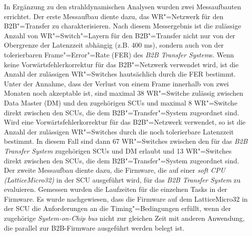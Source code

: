 In Ergänzung zu den strahldynamischen Analysen wurden zwei Messaufbauten errichtet. Der erste Messaufbau diente dazu, das WR"=Netzwerk f\"ur den B2B"=Transfer zu cha­rak­te­ri­sie­ren. Nach diesem Messergebnis ist die zul\"assige Anzahl von WR"=Switch"=Layern f\"ur den B2B"=Transfer nicht nur von der Obergrenze der Latenzzeit abh\"angig (z.B. 400 ms), sondern auch von der tolerierbaren Frame"=Error"=Rate (FER) des \textit{B2B Transfer System}s. Wenn keine Vorw\"artsfehlerkorrektur f\"ur das B2B"=Netzwerk verwendet wird, ist die Anzahl der zul\"assigen WR"=Switches hauts\"achlich durch die FER bestimmt. Unter der Annahme, dass der Verlust von einem Frame innerhalb von zwei Monaten noch akzeptable ist, sind maximal 38 WR"=Switche zul\"assig zwischen Data Master (DM) und den zugeh\"origen SCUs und maximal 8 WR"=Switche direkt zwischen den SCUs, die dem B2B"=Transfer"=System zugeordnet sind. Wird eine Vorw\"artsfehlerkorrektur f\"ur das B2B"=Netzwerk verwendet, so ist die Anzahl der zul\"assigen WR"=Switches durch die noch tolerierbare Latenzzeit bestimmt. In diesem Fall sind dann 67 WR"=Switches zwischen den f\"ur das \textit{B2B Transfer System} zugeh\"origen SCUs  und DM erlaubt und 13 WR"=Switches direkt zwischen den SCUs, die dem B2B"=Transfer"=System zugeordnet sind. Der zweite Messaufbau diente dazu, die Firmware, die auf einer \textit{soft CPU (LatticeMicro32)} in der SCU ausgef\"uhrt wird, f\"ur das \textit{B2B Transfer System} zu evaluieren. Gemessen wurden die Laufzeiten für die einzelnen Tasks in der Firmware. Es wurde nachgewiesen, dass die Firmware auf dem LatticeMicro32 in der SCU die Anforderungen an die  Timing"=Bedingungen erfüllt, wenn der zugeh\"orige \textit{System-on-Chip bus} nicht zur gleichen Zeit mit anderen Anwendung, die parallel zur B2B-Firmware ausgef\"uhrt werden belegt ist.

